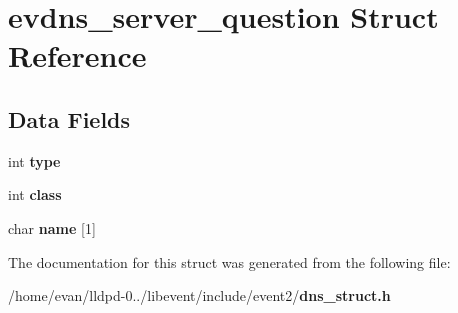 \section{evdns\-\_\-server\-\_\-question \-Struct \-Reference}
\label{structevdns__server__question}
\subsection*{\-Data \-Fields}
\begin{DoxyCompactItemize}
\item 
int {\bfseries type}\label{structevdns__server__question_ac765329451135abec74c45e1897abf26}

\item 
int {\bfseries class}\label{structevdns__server__question_a40f3e25fe8c516c8026cc6c3b6908e12}

\item 
char {\bfseries name} [1]\label{structevdns__server__question_ac8b44a387cf3da062c4a32316b43962c}

\end{DoxyCompactItemize}


\-The documentation for this struct was generated from the following file\-:\begin{DoxyCompactItemize}
\item 
/home/evan/lldpd-\/0../libevent/include/event2/{\bf dns\-\_\-struct.\-h}\end{DoxyCompactItemize}
